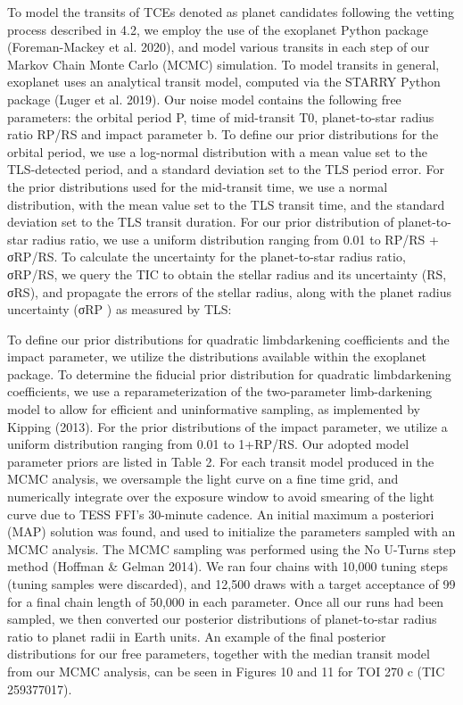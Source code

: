 To model the transits of TCEs denoted as planet candidates
following the vetting process described in 4.2, we employ the
use of the exoplanet Python package (Foreman-Mackey et al.
2020), and model various transits in each step of our Markov
Chain Monte Carlo (MCMC) simulation. To model transits
in general, exoplanet uses an analytical transit model,
computed via the STARRY Python package (Luger et al. 2019).
Our noise model contains the following free parameters: the
orbital period P, time of mid-transit T0, planet-to-star radius
ratio RP/RS and impact parameter b. To define our prior distributions
for the orbital period, we use a log-normal distribution with a mean value set
to the TLS-detected period, and a
standard deviation set to the TLS period error. For the prior
distributions used for the mid-transit time, we use a normal
distribution, with the mean value set to the TLS transit time,
and the standard deviation set to the TLS transit duration. For
our prior distribution of planet-to-star radius ratio, we use a
uniform distribution ranging from 0.01 to RP/RS + σRP/RS.
To calculate the uncertainty for the planet-to-star radius ratio,
σRP/RS, we query the TIC to obtain the stellar radius and its
uncertainty (RS, σRS), and propagate the errors of the stellar radius, along with the planet radius uncertainty (σRP ) as
measured by TLS:

To define our prior distributions for quadratic limbdarkening coefficients
and the impact parameter, we utilize the
distributions available within the exoplanet package. To
determine the fiducial prior distribution for quadratic limbdarkening coefficients,
we use a reparameterization of the
two-parameter limb-darkening model to allow for efficient
and uninformative sampling, as implemented by Kipping
(2013). For the prior distributions of the impact parameter, we
utilize a uniform distribution ranging from 0.01 to 1+RP/RS.
Our adopted model parameter priors are listed in Table 2. For
each transit model produced in the MCMC analysis, we oversample the light curve
on a fine time grid, and numerically
integrate over the exposure window to avoid smearing of the
light curve due to TESS FFI’s 30-minute cadence.
An initial maximum a posteriori (MAP) solution was found,
and used to initialize the parameters sampled with an MCMC
analysis. The MCMC sampling was performed using the No
U-Turns step method (Hoffman & Gelman 2014). We ran
four chains with 10,000 tuning steps (tuning samples were
discarded), and 12,500 draws with a target acceptance of 99%
for a final chain length of 50,000 in each parameter. Once
all our runs had been sampled, we then converted our posterior distributions
of planet-to-star radius ratio to planet radii in
Earth units. An example of the final posterior distributions for
our free parameters, together with the median transit model
from our MCMC analysis, can be seen in Figures 10 and 11
for TOI 270 c (TIC 259377017).

